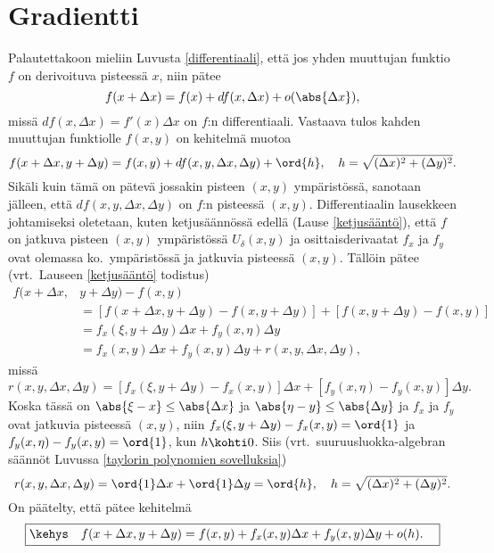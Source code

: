 \section{Gradientti} \label{gradientti}
\alku
{}

Palautettakoon mieliin Luvusta \ref{differentiaali}, että jos yhden muuttujan funktio $f$ on
derivoituva pisteessä $x$, niin pätee
\[
f(x+\Delta x)=f(x)+df(x,\Delta x) + o(\abs{\Delta x}),
\]
missä $df(x,\Delta x)= f'(x)\Delta x$ on $f$:n differentiaali. Vastaava tulos kahden muuttujan
funktiolle $f(x,y)$ on kehitelmä muotoa
\[
f(x+\Delta x,y+\Delta y)=f(x,y)+df(x,y,\Delta x,\Delta y)+\ord{h}, \quad 
                       h=\sqrt{(\Delta x)^2+(\Delta y)^2}.
\]
Sikäli kuin tämä on pätevä jossakin pisteen $(x,y)$ ympäristössä, sanotaan jälleen, että
$df(x,y,\Delta x,\Delta y)$ on $f$:n
%
 pisteessä $(x,y)$. Differentiaalin
lausekkeen johtamiseksi oletetaan, kuten ketjusäännössä edellä (Lause \ref{ketjusääntö}), että
$f$ on jatkuva pisteen $(x,y)$ ympäristössä $U_\delta(x,y)$ ja osittaisderivaatat $f_x$ ja $f_y$
ovat olemassa ko.\ ympäristössä  ja jatkuvia pisteessä $(x,y)$. Tällöin pätee
(vrt.\ Lauseen \ref{ketjusääntö} todistus) 
\begin{align*}
f(x+\Delta x,&y+\Delta y)-f(x,y) \\
             &= [f(x+\Delta x,y+\Delta y)-f(x,y+\Delta y)] + [f(x,y+\Delta y)-f(x,y)] \\
             &= f_x(\xi,y+\Delta y)\Delta x+f_y(x,\eta)\Delta y \\
             &= f_x(x,y)\Delta x + f_y(x,y)\Delta y + r(x,y,\Delta x,\Delta y),
\end{align*}
missä
\[
r(x,y,\Delta x,\Delta y) = [f_x(\xi,y+\Delta y)-f_x(x,y)]\Delta x 
                         + [f_y(x,\eta)-f_y(x,y)]\Delta y.
\]
Koska tässä on $\abs{\xi-x}\le\abs{\Delta x}$ ja $\abs{\eta-y}\le\abs{\Delta y}$ ja $f_x$ ja
$f_y$ ovat jatkuvia pisteessä $(x,y)$, niin $f_x(\xi,y+\Delta y)-f_x(x,y)=\ord{1}$ ja
$f_y(x,\eta)-f_y(x,y)=\ord{1}$, kun $h \kohti 0$. Siis 
(vrt.\ suuruusluokka-algebran säännöt Luvussa \ref{taylorin polynomien sovelluksia})
\[
r(x,y,\Delta x,\Delta y) = \ord{1}\Delta x + \ord{1}\Delta y = \ord{h}, \quad
                                           h=\sqrt{(\Delta x)^2+(\Delta y)^2}.
\]
On päätelty, että pätee kehitelmä
\begin{equation} \label{grad-2}
\boxed{\kehys\quad 
f(x+\Delta x,y+\Delta y)=f(x,y)+f_x(x,y)\Delta x+f_y(x,y)\Delta y+o(h). \quad}
\end{equation}
